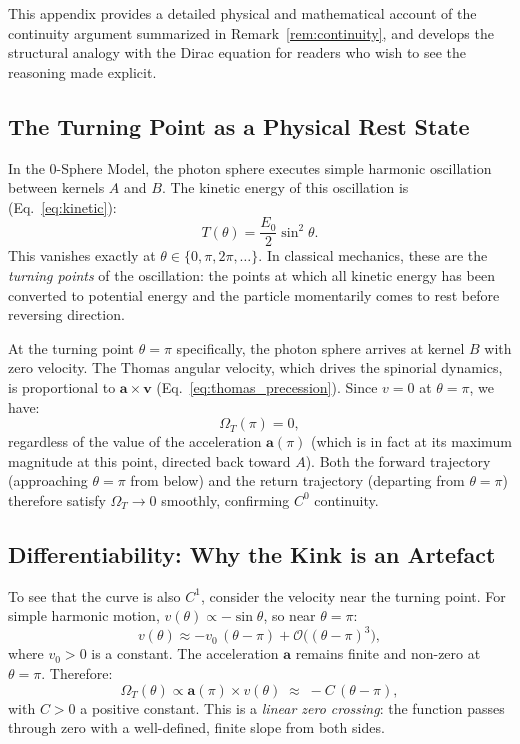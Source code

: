 \documentclass[%
 reprint,
 amsmath,amssymb,
 aps,
 prb,
]{revtex4-2}
\numberwithin{equation}{section}
\theoremstyle{definition}
\theoremstyle{remark}
\begin{document}
This appendix provides a detailed physical and mathematical account of the continuity argument summarized in Remark~\ref{rem:continuity}, and develops the structural analogy with the Dirac equation for readers who wish to see the reasoning made explicit.

\subsection{The Turning Point as a Physical Rest State}

In the 0-Sphere Model, the photon sphere executes simple harmonic oscillation between kernels $A$ and $B$. The kinetic energy of this oscillation is (Eq.~\eqref{eq:kinetic}):
\begin{equation}
T(\theta) = \frac{E_0}{2}\sin^2\theta.
\label{eq:kinetic_app}
\end{equation}
This vanishes exactly at $\theta \in \{0, \pi, 2\pi, \ldots\}$. In classical mechanics, these are the \emph{turning points} of the oscillation: the points at which all kinetic energy has been converted to potential energy and the particle momentarily comes to rest before reversing direction.

At the turning point $\theta = \pi$ specifically, the photon sphere arrives at kernel $B$ with zero velocity. The Thomas angular velocity, which drives the spinorial dynamics, is proportional to $\bm{a} \times \bm{v}$ (Eq.~\eqref{eq:thomas_precession}). Since $v = 0$ at $\theta = \pi$, we have:
\begin{equation}
\Omega_T(\pi) = 0,
\end{equation}
regardless of the value of the acceleration $\bm{a}(\pi)$ (which is in fact at its maximum magnitude at this point, directed back toward $A$). Both the forward trajectory (approaching $\theta = \pi$ from below) and the return trajectory (departing from $\theta = \pi$) therefore satisfy $\Omega_T \to 0$ smoothly, confirming $C^0$ continuity.

\subsection{Differentiability: Why the Kink is an Artefact}

To see that the curve is also $C^1$, consider the velocity near the turning point. For simple harmonic motion, $v(\theta) \propto -\sin\theta$, so near $\theta = \pi$:
\begin{equation}
v(\theta) \approx -v_0\,(\theta - \pi) + \mathcal{O}\bigl((\theta-\pi)^3\bigr),
\end{equation}
where $v_0 > 0$ is a constant. The acceleration $\bm{a}$ remains finite and non-zero at $\theta = \pi$. Therefore:
\begin{equation}
\Omega_T(\theta) \propto \bm{a}(\pi) \times v(\theta)
\;\approx\; -C\,(\theta - \pi),
\end{equation}
with $C > 0$ a positive constant. This is a \emph{linear zero crossing}: the function passes through zero with a well-defined, finite slope from both sides.
\end{document}
